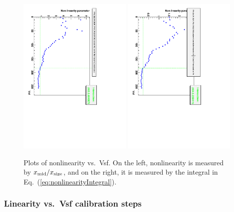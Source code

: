 \begin{figure}
\begin{center}
 \includegraphics[angle=90,width=0.49\textwidth]{nonlinearityPlot_xmidOverXsize.pdf}
 \includegraphics[angle=90,width=0.49\textwidth]{nonlinearityPlot_integral.pdf}
\end{center}
\caption{Plots of nonlinearity vs.~Vsf.  On the left, nonlinearity is measured by $x_{\rm mid}/x_{\rm size}$, and on the right, it is measured by the integral in Eq.~(\ref{eq:nonlinearityIntegral}).}
\label{fig:nonlinearityPlots}
\end{figure}

\subsubsection{Linearity vs.~Vsf calibration steps}

